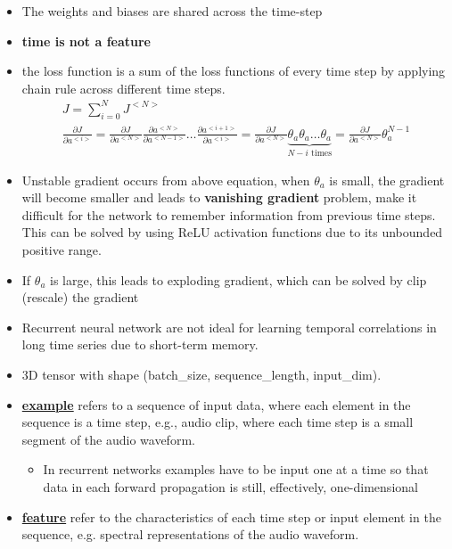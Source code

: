 \documentclass[a4paper,10pt]{article}
\begin{document}
\begin{itemize}
    \item The weights and biases are shared across the time-step
    \item \textbf{time is not a feature}
    \item the loss function is a sum of the loss functions of every time step by applying chain rule across different time steps. 
        \begin{gather*}
            J = \sum_{i=0}^{N}J^{<N>}\\
            \frac{\partial J}{\partial a^{<i>}} = \frac{\partial J}{\partial a^{<N>}}\frac{\partial a^{<N>}}{\partial a^{<N-1>}}\dots\frac{\partial a^{<i+1>}}{\partial a^{<i>}} = \frac{\partial J}{\partial a^{<N>}}\underbrace{\theta_a\theta_a\dots\theta_a}_{N-i\text{ times}} = \frac{\partial J}{\partial a^{<N>}}\theta_a^{N-1}
        \end{gather*}
    \item Unstable gradient occurs from above equation, when $\theta_a$ is small, the gradient will become smaller and leads to \textbf{vanishing gradient} problem,  make it difficult for the network to remember information from previous time steps. This can be solved by using ReLU activation functions due to its unbounded positive range. 
    \item If $\theta_a$ is large, this leads to exploding gradient, which can be solved by clip (rescale) the gradient
    \item Recurrent neural network are not ideal for learning temporal correlations in long time series due to short-term memory. 
\end{itemize}

\begin{itemize}
    \item 3D tensor with shape (batch\_size, sequence\_length, input\_dim).
    \item \underline{\textbf{example}} refers to a sequence of input data, where each element in the sequence is a time step, e.g., audio clip, where each time step is a small segment of the audio waveform.
        \begin{itemize}
            \item In recurrent networks examples have to be input one at a time so that data in each forward propagation is still, effectively, one-dimensional
        \end{itemize}
    \item \underline{\textbf{feature}} refer to the characteristics of each time step or input element in the sequence, e.g. spectral representations of the audio waveform.
\end{itemize}
\end{document}
